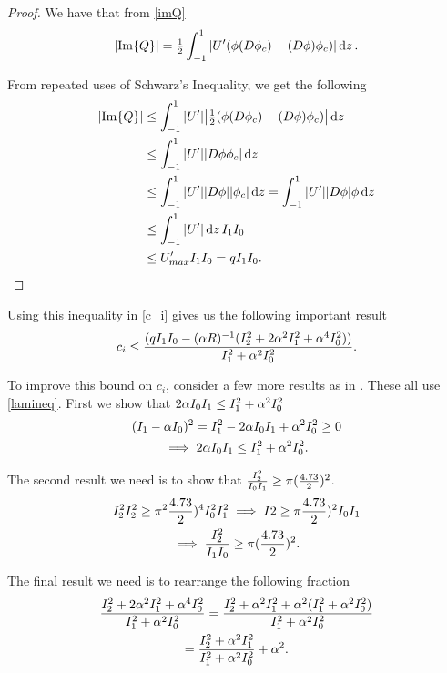 \begin{proof}
We have that from \eqref{imQ}
\begin{equation}
    \abs{\Im{Q}} = \tfrac{1}{2} \int^{1}_{-1} \abs{U' ( \phi ( D \phi_c) - (D \phi) \phi_c)} \dd{z}.
\end{equation}

From repeated uses of Schwarz's Inequality, we get the following
\begin{align}
    \abs{\Im{Q}} &\leq \int^{1}_{-1} \abs{U'} \abs{\tfrac{1}{2} ( \phi (D \phi_c) - (D \phi) \phi_c)} \dd{z} \nonumber\\
    &\leq \int^{1}_{-1} \abs{U'} \abs{D \phi \phi_c} \dd{z} \nonumber\\
    &\leq \int^{1}_{-1} \abs{U'} \abs{D \phi} \abs{\phi_c} \dd{z} = \int^{1}_{-1} \abs{U'} \abs{D \phi}{\phi} \dd{z} \nonumber\\
    &\leq \int^{1}_{-1} \abs{U'} \dd{z} I_1 I_0 \nonumber\\
    &\leq U'_{max} I_1 I_0 = q I_1 I_0.
\end{align}
\end{proof} 

Using this inequality in \eqref{c_i} gives us the following important result
\begin{equation}
        c_i \leq \frac{(q I_1 I_0 - (\alpha R)^{-1} (I^2_{2} + 2 \alpha^2 I^2_{1} + \alpha^4 I^2_{0}))}{I^2_{1} + \alpha^2 I^2_{0}}.
\label{c_iineq}
\end{equation}

To improve this bound on $ c_i $, consider a few more results as in \citet{joseph1968eigenvalue, joseph1969eigenvalue}. These all use \eqref{lamineq}. First we show that $ 2 \alpha I_0 I_1 \leq I^2_{1} + \alpha^2 I^2_{0} $
\begin{gather}
    (I_1 - \alpha I_0)^2 = I^2_{1} - 2 \alpha I_0 I_1 + \alpha^2 I^2_{0} \geq 0 \nonumber\\
    \implies 2 \alpha I_0 I_1 \leq I^2_{1} + \alpha^2 I^2_{0}.
\label{jthm1eqn1}
\end{gather}

The second result we need is to show that $ \frac{I^2_{2}}{I_0 I_1} \geq \pi (\frac{4.73}{2})^2 $.
\begin{gather}
    I^2_{2} I^2_{2} \geq \pi^2 \frac{4.73}{2})^4 I^2_{0} I^2_{1} \implies I{2} \geq \pi \frac{4.73}{2})^2 I_0 I_1 \nonumber\\
    \implies \frac{I^2_{2}}{I_1 I_0} \geq \pi (\frac{4.73}{2})^2.
\label{jthm1eqn2}
\end{gather}

The final result we need is to rearrange the following fraction
\begin{gather}
    \frac{I^2_{2} + 2 \alpha^2 I^2_{1} + \alpha^4 I^2_{0}}{I^2_{1} + \alpha^2 I^2_{0}}
    = \frac{I^2_{2} + \alpha^2 I^2_{1} + \alpha^2 (I^2_{1} + \alpha^2 I^2_{0})}{I^2_{1} + \alpha^2 I^2_{0}} \nonumber\\
    = \frac{I^2_{2} + \alpha^2 I^2_{1}}{I^2_{1} + \alpha^2 I^2_{0}} + \alpha^2.
\end{gather}

